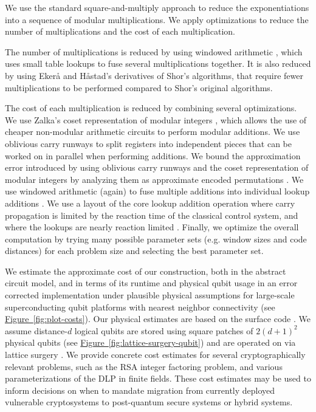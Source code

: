 \documentclass[superscriptaddress,notitlepage,longbibliography]{revtex4-1}
\theoremstyle{definition}
\theoremstyle{definition}
\newcommand{\fig}[1]{\hyperref[fig:#1]{Figure~\ref*{fig:#1}}}
\begin{document}
We use the standard square-and-multiply approach to reduce the exponentiations into a sequence of modular multiplications.
We apply optimizations to reduce the number of multiplications and the cost of each multiplication.

The number of multiplications is reduced by using windowed arithmetic \cite{van2005fastexponentiation,kutin2006shor,gidney2019windowedarithmetic}, which uses small table lookups to fuse several multiplications together.
It is also reduced by using Ekerå and Håstad's derivatives \cite{ekeraa2016modifying, ekeraa2017quantum, ekeraa2017pp, ekeraa2018general} of Shor's algorithms, that require fewer multiplications to be performed  compared to Shor's original algorithms.

The cost of each multiplication is reduced by combining several optimizations.
We use Zalka's coset representation of modular integers \cite{zalka2006pure}, which allows the use of cheaper non-modular arithmetic circuits to perform modular additions.
We use oblivious carry runways \cite{gidney2019approximatepermutation} to split registers into independent pieces that can be worked on in parallel when performing additions.
We bound the approximation error introduced by using oblivious carry runways and the coset representation of modular integers by analyzing them as approximate encoded permutations \cite{gidney2019approximatepermutation}.
We use windowed arithmetic (again) to fuse multiple additions into individual lookup additions \cite{gidney2019windowedarithmetic}.
We use a layout of the core lookup addition operation where carry propagation is limited by the reaction time of the classical control system, and where the lookups are nearly reaction limited \cite{gidney2019autoccz}.
Finally, we optimize the overall computation by trying many possible parameter sets (e.g. window sizes and code distances) for each problem size and selecting the best parameter set.

We estimate the approximate cost of our construction, both in the abstract circuit model, and in terms of its runtime and physical qubit usage in an error corrected implementation under plausible physical assumptions for large-scale superconducting qubit platforms with nearest neighbor connectivity (see \fig{plot-costs}).
Our physical estimates are based on the surface code \cite{fowler2012surfacecodereview}.
We assume distance-$d$ logical qubits are stored using square patches of $2(d+1)^2$ physical qubits (see \fig{lattice-surgery-qubit}) and are operated on via lattice surgery \cite{horsman2012latticesurgery,fowler2018}.
We provide concrete cost estimates for several cryptographically relevant problems, such as the RSA integer factoring problem, and various parameterizations of the DLP in finite fields.
These cost estimates may be used to inform decisions on when to mandate migration from currently deployed vulnerable cryptosystems to post-quantum secure systems or hybrid systems.
\end{document}
